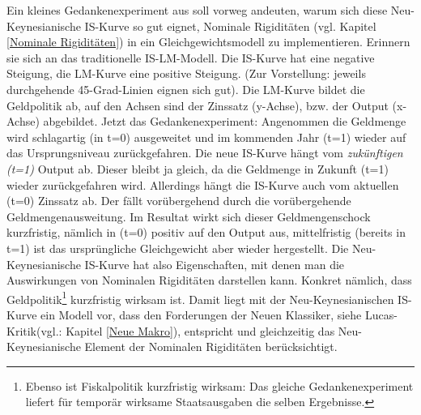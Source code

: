 Ein kleines Gedankenexperiment aus \textcite[S. 243]{Romer2019} soll vorweg andeuten, warum sich diese Neu-Keynesianische IS-Kurve so gut eignet, Nominale Rigiditäten (vgl. Kapitel \ref{Nominale Rigiditäten}) in ein Gleichgewichtsmodell zu implementieren. Erinnern sie sich an das traditionelle IS-LM-Modell. Die IS-Kurve hat eine negative Steigung, die LM-Kurve eine positive Steigung. (Zur Vorstellung: jeweils durchgehende 45-Grad-Linien eignen sich gut). Die LM-Kurve bildet die Geldpolitik ab, auf den Achsen sind der Zinssatz (y-Achse), bzw. der Output (x-Achse) abgebildet. Jetzt das Gedankenexperiment: Angenommen die Geldmenge wird schlagartig (in t=0) ausgeweitet und im kommenden Jahr (t=1) wieder auf das Ursprungsniveau zurückgefahren. Die neue IS-Kurve hängt vom \textit{zukünftigen (t=1)} Output ab. Dieser bleibt ja gleich, da die Geldmenge in Zukunft (t=1) wieder zurückgefahren wird. Allerdings hängt die IS-Kurve auch vom aktuellen (t=0) Zinssatz ab. Der fällt vorübergehend durch die vorübergehende Geldmengenausweitung. Im Resultat wirkt sich dieser Geldmengenschock kurzfristig, nämlich in (t=0) positiv auf den Output aus, mittelfristig (bereits in t=1) ist das ursprüngliche Gleichgewicht aber wieder hergestellt. Die Neu-Keynesianische IS-Kurve hat also Eigenschaften, mit denen man die Auswirkungen von Nominalen Rigiditäten darstellen kann. Konkret nämlich, dass Geldpolitik\footnote{Ebenso ist Fiskalpolitik kurzfristig wirksam: Das gleiche Gedankenexperiment liefert für temporär wirksame Staatsausgaben die selben Ergebnisse.} kurzfristig wirksam ist. Damit liegt mit der Neu-Keynesianischen IS-Kurve ein Modell vor, dass den Forderungen der Neuen Klassiker, siehe Lucas-Kritik(vgl.: Kapitel \ref{Neue Makro}), entspricht und gleichzeitig das Neu-Keynesianische Element der Nominalen Rigiditäten berücksichtigt.

